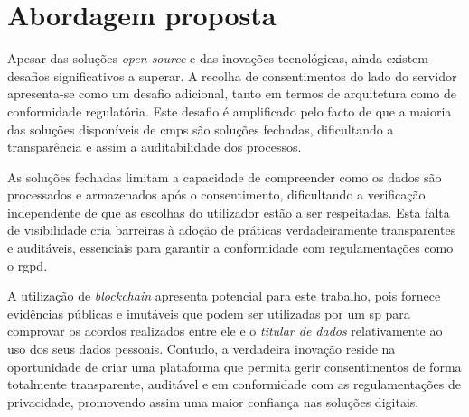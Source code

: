 





\chapter{Abordagem proposta}

Apesar das soluções \textit{open source} e das inovações tecnológicas, ainda existem desafios significativos a superar. A recolha de consentimentos do lado do servidor apresenta-se como um desafio adicional, tanto em termos de arquitetura como de conformidade regulatória. Este desafio é amplificado pelo facto de que a maioria das soluções disponíveis de \acrshort{cmp}s são soluções fechadas, dificultando a transparência e assim a auditabilidade dos processos.

As soluções fechadas limitam a capacidade de compreender como os dados são processados e armazenados após o consentimento, dificultando a verificação independente de que as escolhas do utilizador estão a ser respeitadas. Esta falta de visibilidade cria barreiras à adoção de práticas verdadeiramente transparentes e auditáveis, essenciais para garantir a conformidade com regulamentações como o \acrshort{rgpd}.

A utilização de \textit{blockchain} apresenta potencial para este trabalho, pois fornece evidências públicas e imutáveis que podem ser utilizadas por um \acrshort{sp} para comprovar os acordos realizados entre ele e o \textit{titular de dados} relativamente ao uso dos seus dados pessoais. Contudo, a verdadeira inovação reside na oportunidade de criar uma plataforma que permita gerir consentimentos de forma totalmente transparente, auditável e em conformidade com as regulamentações de privacidade, promovendo assim uma maior confiança nas soluções digitais.

